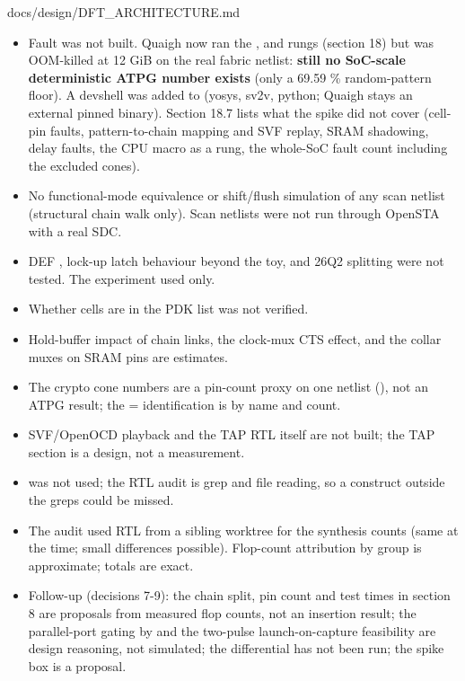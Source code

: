 \begin{relocated}{docs/design/DFT_ARCHITECTURE.md}
\begin{itemize}
\tightlist
\item
  Fault was not built. Quaigh now ran the ,  and
   rungs (section 18) but was OOM-killed at 12 GiB on the real
  fabric netlist: \textbf{still no SoC-scale deterministic ATPG number
  exists} (only a 69.59 \% random-pattern floor). A  devshell
  was added to  (yosys, sv2v, python; Quaigh stays an
  external pinned binary). Section 18.7 lists what the spike did not
  cover (cell-pin faults, pattern-to-chain mapping and SVF replay, SRAM
  shadowing, delay faults, the CPU macro as a rung, the whole-SoC fault
  count including the excluded cones).
\item
  No functional-mode equivalence or shift/\allowbreak{}flush simulation
  of any scan netlist (structural chain walk only). Scan netlists were
  not run through OpenSTA with a real SDC.
\item
  DEF , lock-up latch behaviour beyond the toy, and
  26Q2  splitting were not tested. The
   experiment used  only.
\item
  Whether  cells are in the PDK  list
  was not verified.
\item
  Hold-buffer impact of chain links, the clock-mux CTS effect, and the
  collar muxes on SRAM pins are estimates.
\item
  The crypto cone numbers are a pin-count proxy on one netlist
  (), not an ATPG result; the 
  =  identification is by name and count.
\item
  SVF/\allowbreak{}OpenOCD playback and the TAP RTL itself are not
  built; the TAP section is a design, not a measurement.
\item
   was not used; the RTL audit is grep and file
  reading, so a construct outside the greps could be missed.
\item
  The audit used RTL from a sibling worktree for the synthesis counts
  (same  at the time; small differences possible). Flop-count
  attribution by group is approximate; totals are exact.
\item
  Follow-up (decisions 7-9): the chain split, pin count and test times
  in section 8 are proposals from measured flop counts, not an insertion
  result; the parallel-port gating by  and the two-pulse
  launch-on-capture feasibility are design reasoning, not simulated; the
   differential has not been run; the spike box is a
  proposal.
\end{itemize}


\end{relocated}
